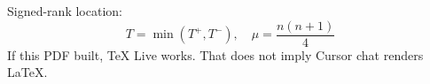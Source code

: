 \documentclass{article}
\begin{document}
Signed-rank location:
\[
T=\min(T^{+},T^{-}),\quad
\mu=\frac{n(n+1)}{4}
\]
If this PDF built, TeX Live works. That does not imply Cursor chat renders LaTeX.
\end{document}
